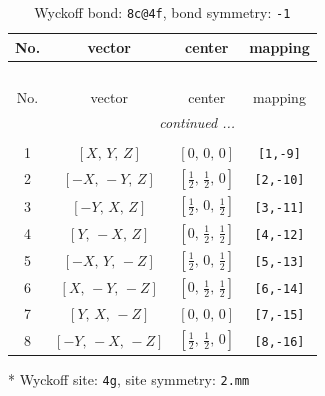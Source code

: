 \documentclass[fleqn,8pt]{jsarticle}
\begin{document}
\renewcommand{\arraystretch}{1.2}
\begin{longtable}{cccc}
\caption{Wyckoff bond: {\tt 8c@4f}, bond symmetry: {\tt -1}}
 \\
 \hline \hline
No. & vector & center & mapping \\ \hline \endfirsthead

\multicolumn{3}{l}{\tablename\ \thetable{}} \\
 \hline \hline
No. & vector & center & mapping \\ \hline \endhead

 \hline \hline
\multicolumn{3}{r}{\footnotesize\it continued ...} \\ \endfoot

 \hline \hline
\multicolumn{3}{r}{} \\ \endlastfoot

1 & $\left[ X,\, Y,\, Z \right]$ & $\left[ 0,\, 0,\, 0 \right]$ & {\tt [1,-9]} \\ \hline
2 & $\left[ - X,\, - Y,\, Z \right]$ & $\left[ \frac{1}{2},\, \frac{1}{2},\, 0 \right]$ & {\tt [2,-10]} \\ \hline
3 & $\left[ - Y,\, X,\, Z \right]$ & $\left[ \frac{1}{2},\, 0,\, \frac{1}{2} \right]$ & {\tt [3,-11]} \\ \hline
4 & $\left[ Y,\, - X,\, Z \right]$ & $\left[ 0,\, \frac{1}{2},\, \frac{1}{2} \right]$ & {\tt [4,-12]} \\ \hline
5 & $\left[ - X,\, Y,\, - Z \right]$ & $\left[ \frac{1}{2},\, 0,\, \frac{1}{2} \right]$ & {\tt [5,-13]} \\ \hline
6 & $\left[ X,\, - Y,\, - Z \right]$ & $\left[ 0,\, \frac{1}{2},\, \frac{1}{2} \right]$ & {\tt [6,-14]} \\ \hline
7 & $\left[ Y,\, X,\, - Z \right]$ & $\left[ 0,\, 0,\, 0 \right]$ & {\tt [7,-15]} \\ \hline
8 & $\left[ - Y,\, - X,\, - Z \right]$ & $\left[ \frac{1}{2},\, \frac{1}{2},\, 0 \right]$ & {\tt [8,-16]} \\
\end{longtable}
* Wyckoff site: {\tt 4g}, site symmetry: {\tt 2.mm}
\renewcommand{\arraystretch}{1.2}
\end{document}
